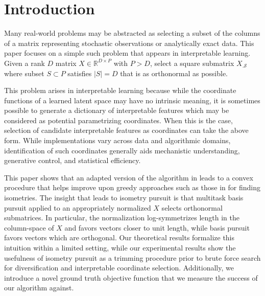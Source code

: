 \section{Introduction}
\label{sec:introduction}

Many real-world problems may be abstracted as selecting a subset of the columns of a matrix representing stochastic observations or analytically exact data.
This paper focuses on a simple such problem that appears in interpretable learning.
Given a rank $D$ matrix $ X \in \mathbb R^{D \times P}$ with $P > D$, select a square submatrix $ X_{.\mathcal S}$ where subset $ S \subset P$ satisfies $| S| = D$ that is as orthonormal as possible.

This problem arises in interpretable learning because while the coordinate functions of a learned latent space may have no intrinsic meaning, it is sometimes possible to generate a dictionary of interpretable features which may be considered as potential parametrizing coordinates.
When this is the case, selection of candidate interpretable features as coordinates can take the above form.
While implementations vary across data and algorithmic domains, identification of such coordinates generally aids mechanistic understanding, generative control, and statistical efficiency.

This paper shows that an adapted version of the algorithm in \citet{Koelle2024-no} leads to a convex procedure that helps improve upon greedy approaches such as those in \citet{5895106, NEURIPS2019_6a10bbd4, Kohli2021-lr, Jones2007-uc} for finding isometries.
The insight that leads to isometry pursuit is that multitask basis pursuit applied to an appropriately normalized $ X$ selects orthonormal submatrices.
In particular, the normalization log-symmetrizes length in the column-space of $ X$ and favors vectors closer to unit length, while basis pursuit favors vectors which are orthogonal.
Our theoretical results formalize this intuition within a limited setting, while our experimental results show the usefulness of isometry pursuit as a trimming procedure prior to brute force search for diversification and interpretable coordinate selection.
Additionally, we introduce a novel ground truth objective function that we measure the success of our algorithm against.

